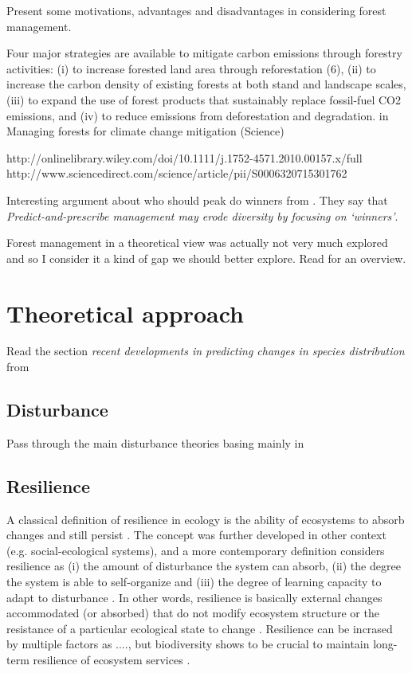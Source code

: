Present some motivations, advantages and disadvantages in considering forest management.

Four major strategies are available to mitigate carbon emissions through forestry activities: (i) to increase forested land area through reforestation (6), (ii) to increase the carbon density of existing forests at both stand and landscape scales, (iii) to expand the use of forest products that sustainably replace fossil-fuel CO2 emissions, and (iv) to reduce emissions from deforestation and degradation. in Managing forests for climate change mitigation (Science)

http://onlinelibrary.wiley.com/doi/10.1111/j.1752-4571.2010.00157.x/full \\
http://www.sciencedirect.com/science/article/pii/S0006320715301762

Interesting argument about who should peak do winners from \citet{Webster2017}. They say that \textit{Predict-and-prescribe management may erode diversity by focusing on ‘winners’}.

Forest management in a theoretical view was actually not very much explored and so I consider it a kind of gap we should better explore. Read \citet{Becknell2015} for an overview.

\section{Theoretical approach}\label{ta}

Read the section \textit{recent developments in predicting changes in species distribution} from \citet{Ehrlen2015}

\subsection{Disturbance}
Pass through the main disturbance theories basing mainly in \citet{Pulsford2016}

\subsection{Resilience}

A classical definition of resilience in ecology is the ability of ecosystems to absorb changes and still persist \citep{Holling1973}.
The concept was further developed in other context (e.g. social-ecological systems), and a more contemporary definition considers resilience as (i) the amount of disturbance the system can absorb, (ii) the degree the system is able to self-organize and (iii) the degree of learning capacity to adapt to disturbance \citep{Cumming2011}.
In other words, resilience is basically external changes accommodated (or absorbed) that do not modify ecosystem structure \citep{Folke2002} or the resistance of a particular ecological state to change \citep{Peterson1998}.
Resilience can be incrased by multiple factors as ...., but biodiversity shows to be crucial to maintain long-term resilience of ecosystem services \citep{Oliver2015}.

